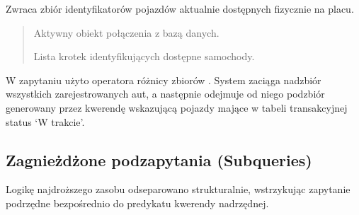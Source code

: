 \documentclass[a4paper,11pt,english,openany,oneside]{sphinxmanual}
\begin{document}
\begin{savenotes}\begin{fulllineitems}

\pysigstartsignatures
\pysiglinewithargsret
{}
{}
{}
\pysigstopsignatures
\sphinxAtStartPar
Zwraca zbiór identyfikatorów pojazdów aktualnie dostępnych fizycznie na placu.
\begin{quote}\begin{description}
\sphinxAtStartPar
{} \textendash{} Aktywny obiekt połączenia z bazą danych.

\sphinxAtStartPar
Lista krotek identyfikujących dostępne samochody.

\end{description}\end{quote}

\sphinxAtStartPar
{} W zapytaniu użyto operatora różnicy zbiorów . System zaciąga nadzbiór wszystkich zarejestrowanych aut, a następnie odejmuje od niego podzbiór generowany przez kwerendę wskazującą pojazdy mające w tabeli transakcyjnej status ‘W trakcie’.

\end{fulllineitems}\end{savenotes}



\subsection{Zagnieżdżone podzapytania (Subqueries)}
\label{\detokenize{rozdzial_5/index:zagniezdzone-podzapytania-subqueries}}
\sphinxAtStartPar
Logikę najdroższego zasobu odseparowano strukturalnie, wstrzykując zapytanie podrzędne bezpośrednio do predykatu kwerendy nadrzędnej.
\end{document}
